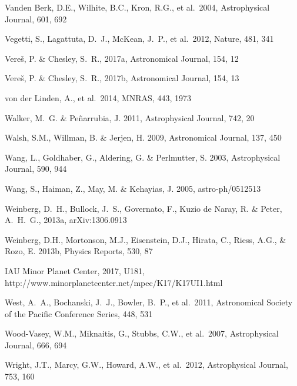 \documentclass[twocolumn]{aastex61}
\begin{document}
\begin{thebibliography}{}
 Vanden Berk, D.E., Wilhite, B.C., Kron, R.G., et al.~2004, Astrophysical Journal, 601, 692

 Vegetti, S., Lagattuta, D.~J., McKean, J.~P., et al.\ 2012, Nature, 481, 341

 Vere{\v s}, P. \& Chesley, S.~R., 2017a, Astronomical Journal, 154, 12

 Vere{\v s}, P. \& Chesley, S.~R., 2017b, Astronomical Journal, 154, 13

 von der Linden, A., et al.~2014, MNRAS, 443, 1973

 Walker, M.~G. \& Pe{\~n}arrubia, J. 2011, Astrophysical Journal, 742, 20


 Walsh, S.M., Willman, B. \& Jerjen, H. 2009, Astronomical Journal, 137, 450

 Wang, L., Goldhaber, G., Aldering, G. \& Perlmutter, S. 2003, Astrophysical Journal, 590, 944

 Wang, S., Haiman, Z., May, M. \& Kehayias, J. 2005, astro-ph/0512513

 Weinberg, D.~H., Bullock, J.~S., Governato, F., Kuzio de Naray, R. \& Peter, A.~H.~G., 2013a, arXiv:1306.0913

 Weinberg, D.H., Mortonson, M.J., Eisenstein, D.J., Hirata, C., Riess, A.G., \& Rozo, E. 2013b, Physics Reports, 530, 87

 IAU Minor Planet Center, 2017, U181, http://www.minorplanetcenter.net/mpec/K17/K17UI1.html

 West, A.~A., Bochanski, J.~J., Bowler, B.~P., et al.~2011, Astronomical Society of the Pacific Conference Series, 448, 531

 Wood-Vasey, W.M., Miknaitis, G., Stubbs, C.W., et al.~2007, Astrophysical Journal, 666, 694

 Wright, J.T., Marcy, G.W., Howard, A.W., et al.~2012, Astrophysical Journal, 753, 160


\end{thebibliography}
\end{document}
